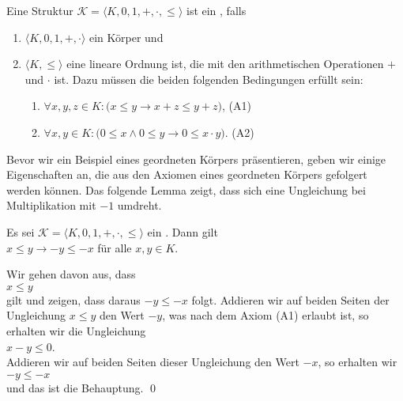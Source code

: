 \begin{Definition}  \hspace*{\fill} \linebreak
  Eine Struktur $\mathcal{K} = \langle K, 0, 1, +, \cdot, \leq \rangle$ ist ein 
  , falls 
  \begin{enumerate}
  \item $\langle K, 0, 1, +, \cdot \rangle$ ein Körper und
  \item $\langle K, \leq \rangle$ eine lineare Ordnung ist, die mit den arithmetischen Operationen $+$ und $\cdot$ 
         ist.  Dazu müssen die beiden folgenden Bedingungen erfüllt sein:
        \begin{enumerate}
        \item $\forall x,y,z \in K: \bigl(x \leq y \rightarrow x + z \leq y + z\bigr)$,  \hspace*{\fill} (A1)
        \item $\forall x,y \in K:\bigl(0 \leq x \wedge 0 \leq y \rightarrow 0 \leq x \cdot y\bigr)$.  \hspace*{\fill} (A2)
        \end{enumerate}
  \end{enumerate}
\end{Definition}

Bevor wir ein Beispiel eines geordneten Körpers präsentieren, geben wir einige Eigenschaften an, die
aus den Axiomen eines geordneten Körpers gefolgert werden können.  Das folgende Lemma zeigt, dass
sich eine Ungleichung bei Multiplikation mit $-1$ umdreht.

\begin{Lemma} \label{lemma:l4}
  Es sei  $\mathcal{K} = \langle K, 0, 1, +, \cdot, \leq \rangle$ ein .
  Dann gilt
  \\[0.2cm]
  \hspace*{1.3cm} $x \leq y \rightarrow -y \leq -x$  \quad für alle $x,y \in K$.
\end{Lemma}

\proof
Wir gehen davon aus, dass
\\[0.2cm]
\hspace*{1.3cm}
$x \leq y$
\\[0.2cm]
gilt und zeigen, dass daraus $-y \leq -x$ folgt.  Addieren wir auf beiden Seiten der Ungleichung 
$x \leq y$ den Wert $-y$, was nach dem Axiom (A1) erlaubt ist, so erhalten wir die Ungleichung
\\[0.2cm]
\hspace*{1.3cm}
$x - y \leq 0$.
\\[0.2cm]
Addieren wir auf beiden Seiten dieser Ungleichung den Wert $-x$, so erhalten wir
\\[0.2cm]
\hspace*{1.3cm}
$-y \leq -x$
\\[0.2cm]
und das ist die Behauptung.  \qed


